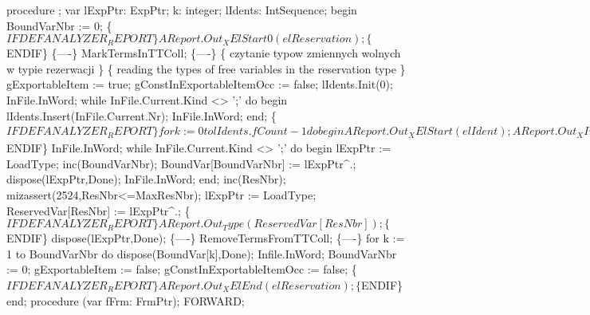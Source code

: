 \nwenddocs{}\endmoddef\nwstartdeflinemarkup{}\nwenddeflinemarkup
procedure ;
var
   lExpPtr: ExpPtr;
   k: integer;
   lIdents: IntSequence;
begin
   BoundVarNbr := 0;
   \{$IFDEF ANALYZER_REPORT\}
   AReport.Out_XElStart0(elReservation);
   \{$ENDIF\}
   \{----\}
   MarkTermsInTTColl;
   \{----\}
   \{ czytanie typow zmiennych wolnych w typie rezerwacji \}
   \{ reading the types of free variables in the reservation type \}
   gExportableItem := true;
   gConstInExportableItemOcc := false;
   lIdents.Init(0);
   InFile.InWord;
   while InFile.Current.Kind <> ';' do
   begin
      lIdents.Insert(InFile.Current.Nr);
      InFile.InWord;
   end;
   \{$IFDEF ANALYZER_REPORT\}
   for k  :=  0 to lIdents.fCount - 1 do
   begin
      AReport.Out_XElStart(elIdent);
      AReport.Out_XIntAttr(atVid, lIdents.fList^[k]);
      AReport.Out_XElEnd0;
   end;
   \{$ENDIF\}
   InFile.InWord;
   while InFile.Current.Kind <> ';' do
   begin
      lExpPtr := LoadType;
      inc(BoundVarNbr);
      BoundVar[BoundVarNbr] := lExpPtr^.;
      dispose(lExpPtr,Done);
      InFile.InWord;
   end;
   inc(ResNbr);
   mizassert(2524,ResNbr<=MaxResNbr);
   lExpPtr := LoadType;
   ReservedVar[ResNbr] := lExpPtr^.;
   \{$IFDEF ANALYZER_REPORT\}
   AReport.Out_Type(ReservedVar[ResNbr]);
   \{$ENDIF\}
   dispose(lExpPtr,Done);
   \{----\}
   RemoveTermsFromTTColl;
   \{----\}
   for k := 1 to BoundVarNbr do dispose(BoundVar[k],Done);
   Infile.InWord;
   BoundVarNbr := 0;
   gExportableItem := false;
   gConstInExportableItemOcc := false;
   \{$IFDEF ANALYZER_REPORT\}
   AReport.Out_XElEnd(elReservation);
   \{$ENDIF\}
end;
\eatline
{}\nwendcode{}\nwdocspar
\nwenddocs{}\endmoddef\nwstartdeflinemarkup{}\nwenddeflinemarkup
procedure (var fFrm: FrmPtr); FORWARD;

